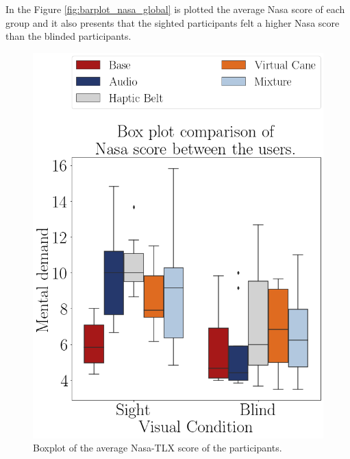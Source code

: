 In the Figure \ref{fig:barplot_nasa_global} is plotted the average Nasa score of each group and it also presents that the sighted participants felt a higher Nasa score than the blinded participants.

\begin{figure}[!htb]
    \begin{minipage}{.45\linewidth}
        \centering
        \includegraphics[width = \linewidth]{Resultados/Nasa/Figuras/png/boxplot_nasa_scene.png}
        \caption{Boxplot of the average Nasa-TLX score of the participants.}
        \label{fig:boxplot_nasa_scene}
    \end{minipage}
    \begin{minipage}{.1\linewidth}
        \hfill
    \end{minipage}
    \begin{minipage}{.45\linewidth}

\end{minipage}
\end{figure}
